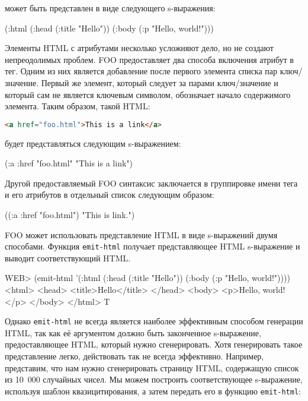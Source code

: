 \noindent{}может быть представлен в виде следующего s-выражения:

\begin{myverb}
  (:html
    (:head (:title "Hello"))
    (:body (:p "Hello, world!")))
\end{myverb}

Элементы HTML с атрибутами несколько усложняют дело, но не создают непреодолимых
проблем. FOO предоставляет два способа включения атрибут в тег. Одним из них
является добавление после первого элемента списка пар ключ/значение. Первый же элемент,
который следует за парами ключ/значение и который сам не является ключевым символом,
обозначает начало содержимого элемента. Таким образом, такой HTML:

\begin{lstlisting}[language=HTML]
  <a href="foo.html">This is a link</a>
\end{lstlisting}

\noindent{}будет представляться следующим s-выражением:

\begin{myverb}
  (:a :href "foo.html" "This is a link")
\end{myverb}

Другой предоставляемый FOO синтаксис заключается в группировке имени тега и его
атрибутов в отдельный список следующим образом:

\begin{myverb}
  ((:a :href "foo.html") "This is link.")
\end{myverb}

FOO может использовать представление HTML в виде s-выражений двумя
способами. Функция \lstinline{emit-html} получает представляющее HTML s-выражение и выводит
соответствующий HTML.

\begin{myverb}
  WEB> (emit-html '(:html (:head (:title "Hello")) (:body (:p "Hello, world!"))))
  <html>
    <head>
      <title>Hello</title>
    </head>
    <body>
      <p>Hello, world!</p>
    </body>
  </html>
  T
\end{myverb}

Однако \lstinline{emit-html} не всегда является наиболее эффективным способом генерации
HTML, так как её аргументом должно быть законченное s-выражение, предоставляющее HTML,
который нужно сгенерировать. Хотя генерировать такое представление легко, действовать так
не всегда эффективно. Например, представим, что нам нужно сгенерировать страницу HTML,
содержащую список из 10~000 случайных чисел. Мы можем построить соответствующее
s-выражение, используя шаблон квазицитирования, а затем передать его в функцию
\lstinline{emit-html}:

